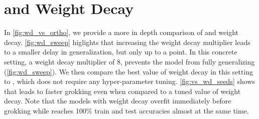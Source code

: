 \section{\ograd and Weight Decay}
In \cref{fig:wd_vs_ortho}, we provide a more in depth comparison of \ograd and weight decay. \cref{fig:wd_sweep} higlights that increasing the weight decay multiplier leads to a smaller delay in generalization, but only up to a point. In this concrete setting, a weight decay multiplier of 8, prevents the model from fully generalizing (\cref{fig:wd_sweep}). We then compare the best value of weight decay in this setting to \ograd, which does not require any hyper-parameter tuning. \cref{fig:vs_wd_seeds} shows that \ograd leads to faster grokking even when compared to a tuned value of weight decay. Note that the models with weight decay overfit immediately before grokking while \ograd reaches 100\% train and test accuracies almost at the same time.



